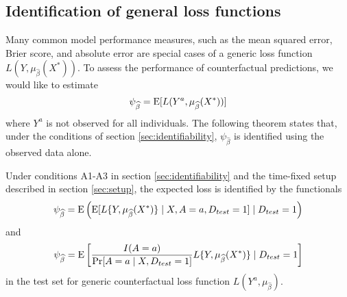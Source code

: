     \subsection{Identification of general loss functions}\label{sec:tf_proof}
    Many common model performance measures, such as the mean squared error, Brier score, and absolute error are special cases of a generic loss function $L(Y, \mu_{\widehat{\beta}}(X^*))$. To assess the performance of counterfactual predictions, we would like to estimate 
    $$\psi_{\widehat{\beta}} = \operatorname{E}[L(Y^a, \mu_{\widehat{\beta}}(X^*))]$$
    where $Y^a$ is not observed for all individuals. The following theorem states that, under the conditions of section \ref{sec:identifiability}, $\psi_{\widehat{\beta}}$ is identified using the observed data alone. 
    \begin{theorem}
        Under conditions A1-A3 in section \ref{sec:identifiability} and the time-fixed setup described in section \ref{sec:setup}, the expected loss is identified by the functionals
        \begin{equation}\label{eqn:app_cl_estimand}
            \psi_{\widehat{\beta}} = \operatorname{E}\left(\operatorname{E}[L\{Y, \mu_{\widehat{\beta}}(X^*)\} \mid X, A=a, D_{test} = 1] \mid D_{test} = 1\right)
        \end{equation}
        and 
        \begin{equation}\label{eqn:app_ipw_estimand}
            \psi_{\widehat{\beta}} = \operatorname{E}\left[\frac{I(A = a)}{\Pr[A = a \mid X, D_{test} = 1]}L\{Y, \mu_{\widehat{\beta}}(X^*)\} \mid D_{test} = 1\right]
        \end{equation}
        in the test set for generic counterfactual loss function $L(Y^{a}, \mu_{\widehat{\beta}})$.
    \end{theorem}
    

